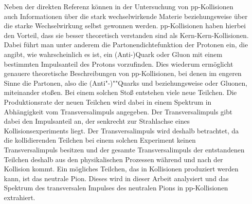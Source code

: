 Neben der direkten Referenz können in der Untersuchung von pp-Kollisionen auch Informationen über die stark wechselwirkende Materie beziehungsweise über die starke Wechselwirkung selbst gewonnen werden.
pp-Kollisionen haben hierbei den Vorteil, dass sie besser theoretisch verstanden sind als Kern-Kern-Kollisionen.
Dabei führt man unter anderem die  Partonendichtefunktion der Protonen ein, die angibt, wie wahrscheinlich es ist, ein (Anti-)Quark oder Gluon mit einem bestimmten Impulsanteil des Protons vorzufinden.
Dies wiederum ermöglicht genauere theoretische Beschreibungen von pp-Kollisionen, bei denen im engeren Sinne die Partonen, also die (Anti"-)""Quarks und beziehungsweise oder Gluonen, miteinander stoßen.
\newline
Bei einem solchen Stoß entstehen viele neue Teilchen.
Die Produktionsrate der neuen Teilchen wird dabei in einem Spektrum in Abhängigkeit vom Transversalimpuls angegeben.
Der Transversalimpuls gibt dabei den Impulsanteil an, der senkrecht zur Strahlachse eines Kollisionsexperiments liegt.
Der Transversalimpuls wird deshalb betrachtet, da die kollidierenden Teilchen bei einem solchen Experiment keinen Transversalimpuls besitzen und der gesamte Transversalimpuls der entstandenen Teilchen deshalb aus den physikalischen Prozessen während und nach der Kollision kommt.
\newline
Ein mögliches Teilchen, das in Kollisionen produziert werden kann, ist das neutrale Pion.
Dieses wird in dieser Arbeit analysiert und das Spektrum des transversalen Impulses des neutralen Pions in pp-Kollisionen extrahiert.